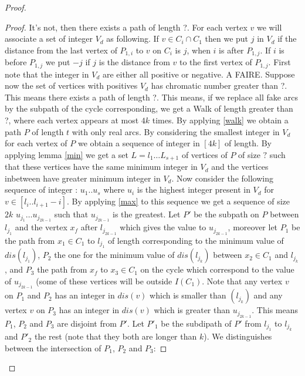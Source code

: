 \documentclass[10pt]{article}
\theoremstyle{plain}
\theoremstyle{definition}
\theoremstyle{remark}
\begin{document}
\begin{proof}
\begin{proof}
It's not, then there exists a path of length ?. 
For each vertex $v$ we will associate a set of integer $V_d$ as following. If $v \in C_i \cap C_1$ then we put $j$ in $V_d$ if the distance
from the last vertex of $P_{1,i}$ to $v$ on $C_i$ is $j$, when $i$ is after $P_{1,j}$. If  $i$ is before $P_{1,j}$ we put $-j$ if $j$ is the distance from
$v$ to the first vertex of $P_{1,j}$. 
First note that the integer in $V_d$ are either all positive or negative. A FAIRE. 
Suppose now the set of vertices with positives $V_d$ has chromatic number greater than ?. This means there exists a path of length ?. This means,
if we replace all fake arcs by the subpath of the cycle corresponding, we get a Walk of length greater than ?, where each vertex appears at most
$4k$ times. By applying \ref{walk} we obtain a path $P$ of length $t$ with only real arcs. By considering the smallest integer in $V_d$ for each vertex
of $P$ we obtain a sequence of integer in $[4k]$ of length. 
By applying lemma \ref{min} we get a set $L = l_1 \dots L_{s+1}$ of vertices of $P$ of size $?$ such that these 
vertices have the same minimum integer in $V_d$ and the vertices inbetween have greater minimum integer in $V_d$. 
Now consider the following sequence of integer : $u_1 .. u_s$ where $u_i$ is the highest integer present in $V_d$ for $v \in [l_i .. l_{i+1} - i]$. 
By applying \ref{max} to this sequence we get a sequence of size $2k$ $u_{j_1} \dots u_{j_{2k-1}}$ such that $u_{j_{2k-1}}$ is the greatest.
Let $P'$ be the subpath on $P$ between $l_{j_1}$ and the vertex $x_f$ after $l_{j_{2k-1}}$ which gives the value to $u_{j_{2k-1}}$, moreover let $P_1$ 
be the path from $x_1 \in C_1$ to $l_{j_1}$ of length corresponding to the minimum value of $dis(l_{j_1})$, $P_2$ the one for the minimum 
value of $dis(l_{j_k})$ between $x_2 \in C_1$ and $l_{j_k}$, and $P_3$ the path from $x_f$ to $x_3 \in C_1$ on the cycle which correspond to the 
value of $u_{j_{2k-1}}$ (some of these vertices will be outside $I(C_1)$. Note that any vertex $v$ on $P_1$ and $P_2$ has an integer in $dis(v)$ 
which is smaller than $(l_{j_k})$ and any vertex $v$ on $P_3$ has an integer in $dis(v)$ which is greater than $u_{j_{2k-1}}$. This means 
$P_1$, $P_2$ and $P_3$ are disjoint from $P'$. Let $P'_1$ be the subdipath of $P'$ from $l_{j_1}$ to $l_{j_k}$ and  $P'_2$ the rest
(note that they both are longer than $k$). 
We distinguishes between the intersection of $P_1$, $P_2$ and $P_3$:


\end{proof}
\end{proof}
\end{document}
